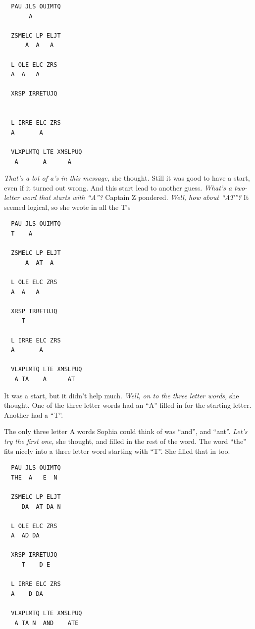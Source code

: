 \documentclass[12pt]{extbook}
\begin{document}
  \begin{lstlisting}
  PAU JLS OUIMTQ
       A
  
  ZSMELC LP ELJT
      A  A   A
  
  L OLE ELC ZRS
  A  A   A
  
  XRSP IRRETUJQ
  
  
  L IRRE ELC ZRS
  A       A
  
  VLXPLMTQ LTE XMSLPUQ
   A       A      A
  \end{lstlisting}
  
  \emph{That's a lot of a's in this message,} she thought. Still it was
  good to have a start, even if it turned out wrong. And this start lead
  to another guess. \emph{What's a two-letter word that starts with
  \enquote{A}?} Captain Z pondered. \emph{Well, how about \enquote{AT}?}
  It seemed logical, so she wrote in all the T's
  
  \begin{lstlisting}
  PAU JLS OUIMTQ
  T    A
  
  ZSMELC LP ELJT
      A  AT  A
  
  L OLE ELC ZRS
  A  A   A
  
  XRSP IRRETUJQ
     T
  
  L IRRE ELC ZRS
  A       A
  
  VLXPLMTQ LTE XMSLPUQ
   A TA    A      AT
  \end{lstlisting}
  
  It was a start, but it didn't help much. \emph{Well, on to the three
  letter words,} she thought. One of the three letter words had an
  \enquote{A} filled in for the starting letter. Another had a
  \enquote{T}.
  
  The only three letter A words Sophia could think of was \enquote{and},
  and \enquote{ant}. \emph{Let's try the first one,} she thought, and
  filled in the rest of the word. The word \enquote{the} fits nicely into
  a three letter word starting with \enquote{T}. She filled that in too.
  
  \begin{lstlisting}
  PAU JLS OUIMTQ
  THE  A   E  N
  
  ZSMELC LP ELJT
     DA  AT DA N
  
  L OLE ELC ZRS
  A  AD DA
  
  XRSP IRRETUJQ
     T    D E
  
  L IRRE ELC ZRS
  A    D DA
  
  VLXPLMTQ LTE XMSLPUQ
   A TA N  AND    ATE
  \end{lstlisting}
  
\end{document}
